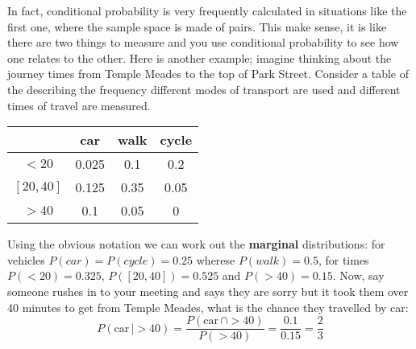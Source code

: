 \documentclass[11pt,a4paper]{scrartcl}
\begin{document}
In fact, conditional probability is very frequently calculated in
situations like the first one, where the sample space is made of
pairs. This make sense, it is like there are two things to measure and
you use conditional probability to see how one relates to the
other. Here is another example; imagine thinking about the journey
times from Temple Meades to the top of Park Street. Consider a table
of the describing the frequency different modes of transport are used and different times of travel are measured.
\begin{center}
\begin{tabular}{c|ccc}
        &car    &walk  &cycle\\
\hline
$<20$     &0.025  &0.1   &0.2\\
$[20,40]$ &0.125  &0.35  &0.05\\
$>40$     &0.1    &0.05  &0
\end{tabular}
\end{center}
Using the obvious notation we can work out the \textbf{marginal}
distributions: for vehicles $P(car)=P(cycle)=0.25$ wherese
$P(walk)=0.5$, for times $P(<20)=0.325$, $P([20,40])=0.525$ and
$P(>40)=0.15$. Now, say someone rushes in to your meeting and says
they are sorry but it took them over 40 minutes to get from Temple
Meades, what is the chance they travelled by car:
\begin{equation}
P(\mbox{car}\,|>40)=\frac{P(\mbox{car}\,\cap >40)}{P(>40)}=\frac{0.1}{0.15}=\frac{2}{3}
\end{equation}
\end{document}
